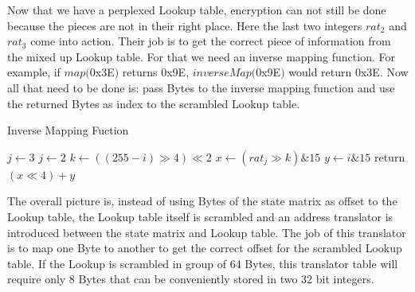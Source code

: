 Now that we have a perplexed Lookup table, encryption can not still be done because the pieces are not in their right place. Here the last two integers $rat_2$ and $rat_3$ come into action. Their job is to get the correct piece of information from the mixed up Lookup table. For that we need an inverse mapping function. For example, if $map($0x3E$)$ returns 0x9E, $inverseMap($0x9E$)$ would return 0x3E. Now all that need to be done is: pass Bytes to the inverse mapping function and use the returned Bytes as index to the scrambled Lookup table.\\

\begin{algorithm}
	\caption{Inverse Mapping Fuction}
	\label{Inverse Mapping Function}

	\begin{algorithmic}[1]

	\State $j \gets 3$
		\State $j \gets 2$
	\EndIf
	\State $k \gets ((255-i)\gg 4)\ll 2$
	\State $x \gets (rat_j\gg k)\mathrel{\&} 15$
	\State $y \gets i \mathrel{\&} 15$
	\State return $(x\ll 4)+y$
	\EndFunction
	\end{algorithmic}
\end{algorithm}

The overall picture is, instead of using Bytes of the state matrix as offset to the Lookup table, the Lookup table itself is scrambled and an address translator is introduced between the state matrix and Lookup table. The job of this translator is to map one Byte to another to get the correct offset for the scrambled Lookup table. If the Lookup is scrambled in group of 64 Bytes, this translator table will require only 8 Bytes that can be conveniently stored in two 32 bit integers.

